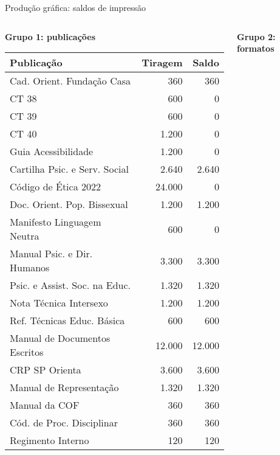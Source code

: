 \documentclass{beamer}
\begin{document}
\begin{frame}{Produção gráfica: saldos de impressão}
	\begin{columns}[T]
		\begin{column}{0.48\textwidth}
			{\small\textbf{Grupo 1: publicações}}
			\vspace{0.2cm}

			{\tiny
			\begin{tabular}{p{}rr}
				\hline
				\textbf{Publicação} & \textbf{Tiragem} & \textbf{Saldo} \\
				\hline
				Cad. Orient. Fundação Casa & 360 & 360 \\
				CT 38 & 600 & 0 \\
				CT 39 & 600 & 0 \\
				CT 40 & 1.200 & 0 \\
				Guia Acessibilidade & 1.200 & 0 \\
				Cartilha Psic. e Serv. Social & 2.640 & 2.640 \\
				Código de Ética 2022 & 24.000 & 0 \\
				Doc. Orient. Pop. Bissexual & 1.200 & 1.200 \\
				Manifesto Linguagem Neutra & 600 & 0 \\
				Manual Psic. e Dir. Humanos & 3.300 & 3.300 \\
				Psic. e Assist. Soc. na Educ. & 1.320 & 1.320 \\
				Nota Técnica Intersexo & 1.200 & 1.200 \\
				Ref. Técnicas Educ. Básica & 600 & 600 \\
				Manual de Documentos Escritos & 12.000 & 12.000 \\
				CRP SP Orienta & 3.600 & 3.600 \\
				Manual de Representação & 1.320 & 1.320 \\
				Manual da COF & 360 & 360 \\
				Cód. de Proc. Disciplinar & 360 & 360 \\
				Regimento Interno & 120 & 120 \\
				\hline
			\end{tabular}}
		\end{column}

		\begin{column}{0.48\textwidth}
			{\small\textbf{Grupo 2: formatos}}
			\vspace{0.2cm}


\end{column}
\end{columns}
\end{frame}
\end{document}
